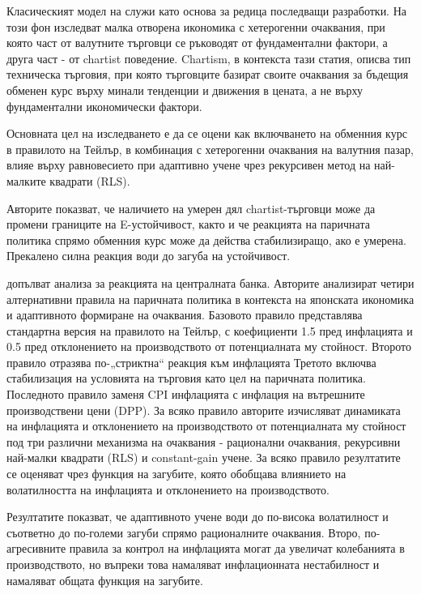 Класическият модел на \textcite{Gali_Monacelli2005} служи като основа за редица последващи разработки. На този фон \textcite{BaskSelander2007} изследват малка отворена икономика с хетерогенни очаквания, при която част от валутните търговци се ръководят от фундаментални фактори, а друга част - от chartist поведение. Chartism, в контекста тази статия, описва тип техническа търговия, при която търговците базират своите очаквания за бъдещия обменен курс върху минали тенденции и движения в цената, а не върху фундаментални икономически фактори. 

Основната цел на изследването е да се оцени как включването на обменния курс в правилото на Тейлър, в комбинация с хетерогенни очаквания на валутния пазар, влияе върху равновесието при адаптивно учене чрез рекурсивен метод на най-малките квадрати (RLS).

Авторите показват, че наличието на умерен дял chartist-търговци може да промени границите на E-устойчивост, както и че реакцията на паричната политика спрямо обменния курс може да действа стабилизиращо, ако е умерена. Прекалено силна реакция води до загуба на устойчивост.

\textcite{Chen2008} допълват анализа за реакцията на централната банка. Авторите анализират четири алтернативни правила на паричната политика в контекста на японската икономика и адаптивното формиране на очаквания. Базовото правило представлява стандартна версия на правилото на Тейлър, с коефициенти 1.5 пред инфлацията и 0.5 пред отклонението на производството от потенциалната му стойност. Второто правило отразява по-„стриктна“ реакция към инфлацията  Третото включва стабилизация на условията на търговия като цел на паричната политика. Последното правило заменя CPI инфлацията с инфлация на вътрешните производствени цени (DPP). За всяко правило авторите изчисляват динамиката на инфлацията и отклонението на производството от потенциалната му стойност под три различни механизма на очаквания - рационални очаквания, рекурсивни най-малки квадрати (RLS) и constant-gain учене. За всяко правило резултатите се оценяват чрез функция на загубите, която обобщава влиянието на волатилността на инфлацията и отклонението на производството.

Резултатите показват, че адаптивното учене води до по-висока волатилност и съответно до по-големи загуби спрямо рационалните очаквания. Второ, по-агресивните правила за контрол на инфлацията могат да увеличат колебанията в производството, но въпреки това намаляват инфлационната нестабилност и намаляват общата функция на загубите.

